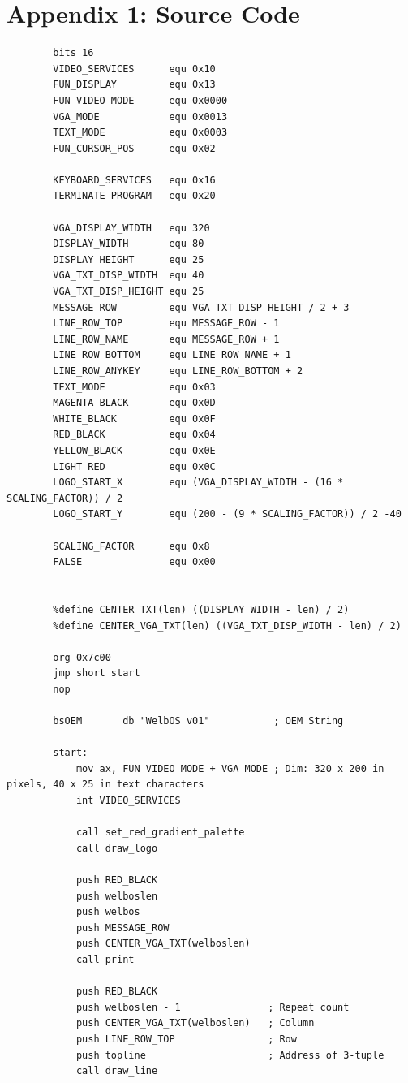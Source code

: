 \documentclass{article}
\begin{document}
    \section{Appendix 1: Source Code}\label{sec:appendix_1}
    \begin{lstlisting}
        bits 16
        VIDEO_SERVICES      equ 0x10
        FUN_DISPLAY         equ 0x13
        FUN_VIDEO_MODE      equ 0x0000
        VGA_MODE            equ 0x0013
        TEXT_MODE           equ 0x0003
        FUN_CURSOR_POS      equ 0x02

        KEYBOARD_SERVICES   equ 0x16
        TERMINATE_PROGRAM   equ 0x20

        VGA_DISPLAY_WIDTH   equ 320
        DISPLAY_WIDTH       equ 80
        DISPLAY_HEIGHT      equ 25
        VGA_TXT_DISP_WIDTH  equ 40
        VGA_TXT_DISP_HEIGHT equ 25
        MESSAGE_ROW         equ VGA_TXT_DISP_HEIGHT / 2 + 3
        LINE_ROW_TOP        equ MESSAGE_ROW - 1
        LINE_ROW_NAME       equ MESSAGE_ROW + 1
        LINE_ROW_BOTTOM     equ LINE_ROW_NAME + 1
        LINE_ROW_ANYKEY     equ LINE_ROW_BOTTOM + 2
        TEXT_MODE           equ 0x03
        MAGENTA_BLACK       equ 0x0D
        WHITE_BLACK         equ 0x0F
        RED_BLACK           equ 0x04
        YELLOW_BLACK        equ 0x0E
        LIGHT_RED           equ 0x0C
        LOGO_START_X        equ (VGA_DISPLAY_WIDTH - (16 * SCALING_FACTOR)) / 2
        LOGO_START_Y        equ (200 - (9 * SCALING_FACTOR)) / 2 -40

        SCALING_FACTOR      equ 0x8
        FALSE               equ 0x00


        %define CENTER_TXT(len) ((DISPLAY_WIDTH - len) / 2)
        %define CENTER_VGA_TXT(len) ((VGA_TXT_DISP_WIDTH - len) / 2)

        org 0x7c00
        jmp short start
        nop

        bsOEM       db "WelbOS v01"           ; OEM String

        start:
            mov ax, FUN_VIDEO_MODE + VGA_MODE ; Dim: 320 x 200 in pixels, 40 x 25 in text characters
            int VIDEO_SERVICES

            call set_red_gradient_palette
            call draw_logo

            push RED_BLACK
            push welboslen
            push welbos
            push MESSAGE_ROW
            push CENTER_VGA_TXT(welboslen)
            call print

            push RED_BLACK
            push welboslen - 1               ; Repeat count
            push CENTER_VGA_TXT(welboslen)   ; Column
            push LINE_ROW_TOP                ; Row
            push topline                     ; Address of 3-tuple
            call draw_line


\end{lstlisting}
\end{document}
